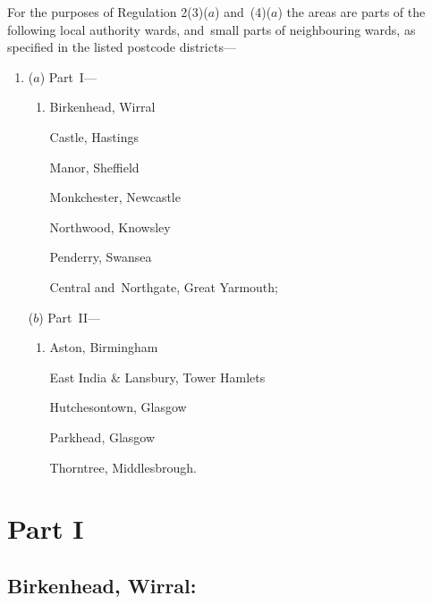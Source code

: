 \documentclass[12pt,a4paper]{article}
\begin{document}
For the purposes of Regulation 2(3)($a$)  and~(4)($a$)  the areas are parts of the following local authority wards, and~small parts of neighbouring wards, as specified in the listed postcode districts—
\begin{enumerate}\item[]
($a$) Part~I—
\begin{enumerate}\item[]
    Birkenhead, Wirral

    Castle, Hastings

    Manor, Sheffield

    Monkchester, Newcastle

    Northwood, Knowsley

    Penderry, Swansea

    Central and~Northgate, Great Yarmouth; 
\end{enumerate}

($b$) Part~II—
\begin{enumerate}\item[]
    Aston, Birmingham

    East India \& Lansbury, Tower Hamlets

    Hutchesontown, Glasgow

    Parkhead, Glasgow

    Thorntree, Middlesbrough. 
\end{enumerate}
\end{enumerate}

\section{Part I}

\renewcommand\parthead{--- Schedule Part I}

\subsection*{Birkenhead, Wirral:}
\end{document}
